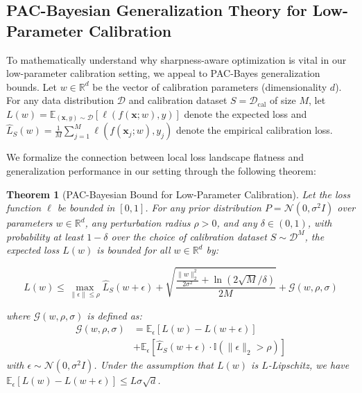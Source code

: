 \documentclass{article}
\theoremstyle{plain}
\newtheorem{theorem}{Theorem}[section]
\theoremstyle{definition}
\theoremstyle{remark}
\begin{document}
\subsection{PAC-Bayesian Generalization Theory for Low-Parameter Calibration}
To mathematically understand why sharpness-aware optimization is vital in our low-parameter calibration setting, we appeal to PAC-Bayes generalization bounds. Let $w \in \mathbb{R}^d$ be the vector of calibration parameters (dimensionality $d$). For any data distribution $\mathcal{D}$ and calibration dataset $S = \mathcal{D}_{\text{cal}}$ of size $M$, let $L(w) = \mathbb{E}_{(\mathbf{x}, y) \sim \mathcal{D}} [\ell(f(\mathbf{x}; w), y)]$ denote the expected loss and $\widehat{L}_S(w) = \frac{1}{M} \sum_{j=1}^M \ell(f(\mathbf{x}_j; w), y_j)$ denote the empirical calibration loss.

We formalize the connection between local loss landscape flatness and generalization performance in our setting through the following theorem:

\begin{theorem}[PAC-Bayesian Bound for Low-Parameter Calibration]
\label{thm:pac_bayes}
Let the loss function $\ell$ be bounded in $[0, 1]$. For any prior distribution $P = \mathcal{N}(0, \sigma^2 I)$ over parameters $w \in \mathbb{R}^d$, any perturbation radius $\rho > 0$, and any $\delta \in (0, 1)$, with probability at least $1 - \delta$ over the choice of calibration dataset $S \sim \mathcal{D}^M$, the expected loss $L(w)$ is bounded for all $w \in \mathbb{R}^d$ by:
\begin{small}
\begin{equation}
    L(w) \le \max_{\|\epsilon\| \le \rho} \widehat{L}_{S}(w + \epsilon) + \sqrt{\frac{\frac{\|w\|_2^2}{2\sigma^2} + \ln(2\sqrt{M}/\delta)}{2M}} + \mathcal{G}(w, \rho, \sigma)
\end{equation}
\end{small}
where $\mathcal{G}(w, \rho, \sigma)$ is defined as:
\begin{align}
    \mathcal{G}(w, \rho, \sigma) &= \mathbb{E}_{\epsilon} [L(w) - L(w + \epsilon)] \nonumber \\
    &+ \mathbb{E}_{\epsilon} [\widehat{L}_S(w + \epsilon) \cdot \mathbb{I}(\|\epsilon\|_2 > \rho)]
\end{align}
with $\epsilon \sim \mathcal{N}(0, \sigma^2 I)$. Under the assumption that $L(w)$ is $L$-Lipschitz, we have $\mathbb{E}_{\epsilon} [L(w) - L(w+\epsilon)] \le L \sigma \sqrt{d}$.
\end{theorem}
\end{document}
